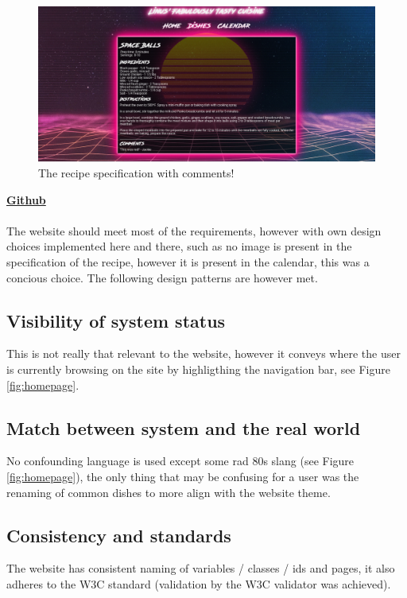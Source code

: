 \documentclass[a4paper]{scrartcl}
\begin{document}
\begin{figure}[H]
  \begin{center}
    \includegraphics[scale=0.25]{Scr4.jpg}
    \caption{The recipe specification with comments!}
    \label{fig:recipe}
  \end{center}
\end{figure}
\newpage
\newpage
\noindent
\textbf{\href{https://github.com/linus-dev/KTH-Projects/tree/master/ID1354/1}{Github}}\\\\
The website should meet most of the requirements, however with own design choices implemented here and
there, such as no image is present in the specification of the recipe, however it is present in the
calendar, this was a concious choice. The following design patterns are however met.
\subsection{Visibility of system status}
This is not really that relevant to the website, however it conveys where the user
is currently browsing on the site by highligthing the navigation bar, see Figure \ref{fig:homepage}.
\subsection{Match between system and the real world}
No confounding language is used except some rad 80s slang (see Figure \ref{fig:homepage}),
the only thing that may be confusing for a user was the renaming of common dishes
to more align with the website theme.
\subsection{Consistency and standards}
The website has consistent naming of variables / classes / ids and pages, it also
adheres to the W3C standard (validation by the W3C validator was achieved).
\end{document}
